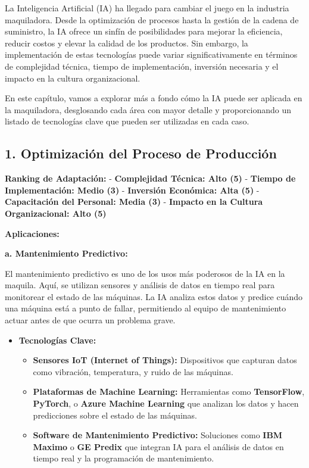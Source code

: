 \documentclass[
  10pt,
  letterpaper,
]{book}
\providecommand{\tightlist}{%
  \setlength{\itemsep}{0pt}\setlength{\parskip}{0pt}}\usepackage{longtable,booktabs,array}
\begin{document}
La Inteligencia Artificial (IA) ha llegado para cambiar el juego en la
industria maquiladora. Desde la optimización de procesos hasta la
gestión de la cadena de suministro, la IA ofrece un sinfín de
posibilidades para mejorar la eficiencia, reducir costos y elevar la
calidad de los productos. Sin embargo, la implementación de estas
tecnologías puede variar significativamente en términos de complejidad
técnica, tiempo de implementación, inversión necesaria y el impacto en
la cultura organizacional.

En este capítulo, vamos a explorar más a fondo cómo la IA puede ser
aplicada en la maquiladora, desglosando cada área con mayor detalle y
proporcionando un listado de tecnologías clave que pueden ser utilizadas
en cada caso.

\subsection{\texorpdfstring{1. \textbf{Optimización del Proceso de
Producción}}{1. Optimización del Proceso de Producción}}\label{optimizaciuxf3n-del-proceso-de-producciuxf3n}

\textbf{Ranking de Adaptación:} - \textbf{Complejidad Técnica: Alto (5)}
- \textbf{Tiempo de Implementación: Medio (3)} - \textbf{Inversión
Económica: Alta (5)} - \textbf{Capacitación del Personal: Media (3)} -
\textbf{Impacto en la Cultura Organizacional: Alto (5)}

\textbf{Aplicaciones:}

\textbf{a. Mantenimiento Predictivo:}

El mantenimiento predictivo es uno de los usos más poderosos de la IA en
la maquila. Aquí, se utilizan sensores y análisis de datos en tiempo
real para monitorear el estado de las máquinas. La IA analiza estos
datos y predice cuándo una máquina está a punto de fallar, permitiendo
al equipo de mantenimiento actuar antes de que ocurra un problema grave.

\begin{itemize}
\tightlist
\item
  \textbf{Tecnologías Clave:}

  \begin{itemize}
  \tightlist
  \item
    \textbf{Sensores IoT (Internet of Things):} Dispositivos que
    capturan datos como vibración, temperatura, y ruido de las máquinas.
  \item
    \textbf{Plataformas de Machine Learning:} Herramientas como
    \textbf{TensorFlow}, \textbf{PyTorch}, o \textbf{Azure Machine
    Learning} que analizan los datos y hacen predicciones sobre el
    estado de las máquinas.
  \item
    \textbf{Software de Mantenimiento Predictivo:} Soluciones como
    \textbf{IBM Maximo} o \textbf{GE Predix} que integran IA para el
    análisis de datos en tiempo real y la programación de mantenimiento.
  \end{itemize}
\end{itemize}
\end{document}
